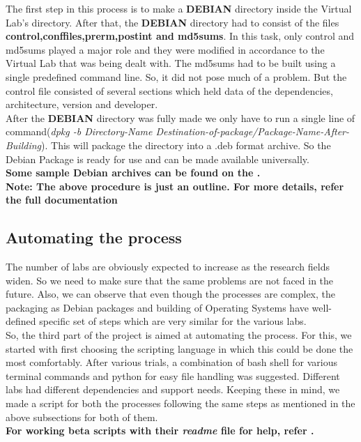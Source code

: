\documentclass[conference]{IEEEtran}
\begin{document}
  The first step in this process is to make a \textbf{DEBIAN} directory inside the Virtual Lab's directory. After that, the \textbf{DEBIAN} directory had to consist of the files \textbf{control,conffiles,prerm,postint and md5sums}. In this task, only control and md5sums played a major role and they were modified in accordance to the Virtual Lab that was being dealt with. The md5sums had to be built using a single predefined command line. So, it did not pose much of a problem. But the control file consisted of several sections which held data of the dependencies, architecture, version and developer.\\
  After the \textbf{DEBIAN} directory was fully made we only have to run a single line of command(\textit{dpkg -b Directory-Name Destination-of-package/Package-Name-After-Building}). This will package the directory into a .deb format archive. So the Debian Package is ready for use and can be made available universally.\\
  \textbf{Some sample Debian archives can be found on the \cite {DebPack}.}\\
  \textbf{ Note: The above procedure is just an outline. For more details, refer the full documentation \cite {DebPackI}}
  \subsection{Automating the process}
  The number of labs are obviously expected to increase as the research fields widen. So we need to make sure that the same problems are not faced in the future. Also, we can observe that even though the processes are complex, the packaging as Debian packages and building of Operating Systems have well-defined specific set of steps which are very similar for the various labs.\\
  So, the third part of the project is aimed at automating the process. For this, we started with first choosing the scripting language in which this could be done the most comfortably. After various trials, a combination of bash shell for various terminal commands and python for easy file handling was suggested. Different labs had different dependencies and support needs. Keeping these in mind, we made a script for both the processes following the same steps as mentioned in the above subsections for both of them.\\
  \textbf{For working beta scripts with their \textit{readme} file for help, refer \cite {ASP}.}  
\end{document}
